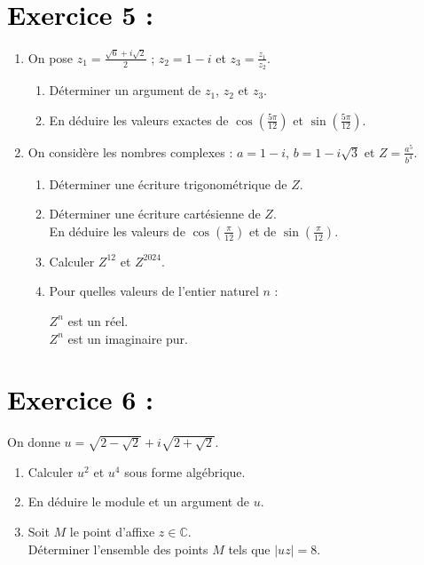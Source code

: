 \documentclass[12pt]{article}
\begin{document}
\section*{\textcolor{black}{Exercice 5 :}}
\begin{enumerate}
    \item On pose $z_1 = \frac{\sqrt{6} + i\sqrt{2}}{2}$ ; $z_2 = 1 - i$ et $z_3 = \frac{z_1}{z_2}$.
    \begin{enumerate}
        \item Déterminer un argument de $z_1$, $z_2$ et $z_3$.
        \item En déduire les valeurs exactes de $\cos\left(\frac{5\pi}{12}\right)$ et $\sin\left(\frac{5\pi}{12}\right)$.
    \end{enumerate}
    \item On considère les nombres complexes : $a = 1 - i$, $b = 1 - i\sqrt{3}$ et $Z = \frac{a^5}{b^4}$.
    \begin{enumerate}
        \item Déterminer une écriture trigonométrique de $Z$.
        \item Déterminer une écriture cartésienne de $Z$. \\
        En déduire les valeurs de $\cos\left(\frac{\pi}{12}\right)$ et de $\sin\left(\frac{\pi}{12}\right)$.
        \item Calculer $Z^{12}$ et $Z^{2024}$.
        \item Pour quelles valeurs de l’entier naturel $n$ :
        
        $Z^{n}$ est un réel.\\
        $Z^{n}$ est un imaginaire pur.\\
    \end{enumerate}
\end{enumerate}
\section*{\textcolor{black}{Exercice 6 :}}
On donne $u = \sqrt{2 - \sqrt{2}} + i \sqrt{2 + \sqrt{2}}.$

\begin{enumerate}
    \item Calculer $u^2$ et $u^4$ sous forme algébrique.
    \item En déduire le module et un argument de $u$.
    \item Soit $M$ le point d’affixe $z \in \mathbb{C}$.\\ Déterminer l’ensemble des points $M$ tels que $|uz| = 8$.
\end{enumerate}
\end{document}
